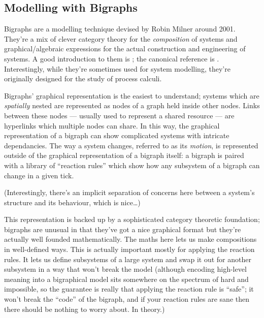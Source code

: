 \documentclass{article}
\begin{document}
\subsection{Modelling with Bigraphs}

Bigraphs are a modelling technique devised by Robin Milner around 2001. They're a mix of clever category theory for the
\emph{composition} of systems and graphical/algebraic expressions for the actual construction and engineering of
systems. A good introduction to them is \cite{milner:bigraphsandtheiralgebra}; the canonical reference is
\cite{milner:spaceandmotion}. Interestingly, while they're sometimes used for system modelling, they're originally
designed for the study of process calculi.\par

Bigraphs' graphical representation is the easiest to understand; systems which are \emph{spatially} nested are
represented as nodes of a graph held inside other nodes. Links between these nodes --- usually used to represent a
shared resource --- are hyperlinks which multiple nodes can share. In this way, the graphical representation of a
bigraph can show complicated systems with intricate dependancies. The way a system changes, referred to as its
\emph{motion}, is represented outside of the graphical representation of a bigraph itself: a bigraph is paired with a
library of ``reaction rules'' which show how any subsystem of a bigraph can change in a given tick.\par

(Interestingly, there's an implicit separation of concerns here between a system's structure and its behaviour, which is
nice\ldots{})\par

This representation is backed up by a sophisticated category theoretic foundation; bigraphs are unusual in that they've
got a nice graphical format but they're actually well founded mathematically. The maths here lets us make compositions
in well-defined ways. This is actually important mostly for applying the reaction rules. It lets us define subsystems of
a large system and swap it out for another subsystem in a way that won't break the model (although encoding high-level
meaning into a bigraphical model sits somewhere on the spectrum of hard and impossible, so the guarantee is really that
applying the reaction rule is ``safe''; it won't break the ``code'' of the bigraph, and if your reaction rules are sane
then there should be nothing to worry about. In theory.)\par
\end{document}
